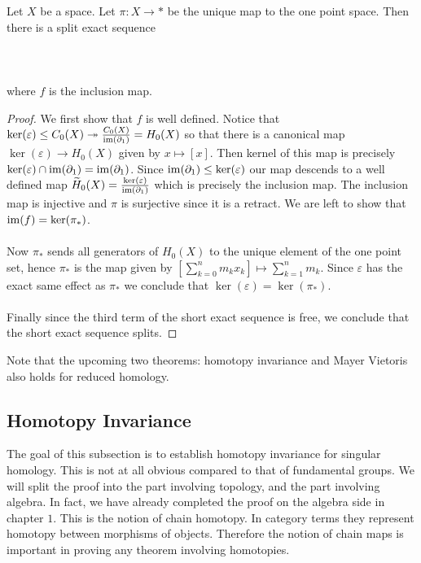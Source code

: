 \documentclass[a4paper]{article}
\begin{document}
\begin{prp}{}{} Let $X$ be a space. Let $\pi:X\to\ast$ be the unique map to the one point space. Then there is a split exact sequence \\~\\
\\~\\
where $f$ is the inclusion map. \tcbline
\begin{proof}
We first show that $f$ is well defined. Notice that $\ker(\varepsilon)\leq C_0(X)\twoheadrightarrow\frac{C_0(X)}{\operatorname{im}(\partial_1)}=H_0(X)$ so that there is a canonical map $\ker(\varepsilon)\to H_0(X)$ given by $x\mapsto[x]$. Then kernel of this map is precisely $\ker(\varepsilon)\cap\operatorname{im}(\partial_1)=\operatorname{im}(\partial_1)$. Since $\operatorname{im}(\partial_1)\leq\ker(\varepsilon)$ our map descends to a well defined map $\widetilde{H}_0(X)=\frac{\ker(\varepsilon)}{\operatorname{im}(\partial_1)}$ which is precisely the inclusion map. The inclusion map is injective and $\pi$ is surjective since it is a retract. We are left to show that $\operatorname{im}(f)=\ker(\pi_\ast)$. \\~\\

Now $\pi_\ast$ sends all generators of $H_0(X)$ to the unique element of the one point set, hence $\pi_\ast$ is the map given by $\left[\sum_{k=0}^nm_k x_k\right]\mapsto\sum_{k=1}^nm_k$. Since $\varepsilon$ has the exact same effect as $\pi_\ast$ we conclude that $\ker(\varepsilon)=\ker(\pi_\ast)$. \\~\\

Finally since the third term of the short exact sequence is free, we conclude that the short exact sequence splits. 
\end{proof}
\end{prp}

Note that the upcoming two theorems: homotopy invariance and Mayer Vietoris also holds for reduced homology. 

\subsection{Homotopy Invariance}
The goal of this subsection is to establish homotopy invariance for singular homology. This is not at all obvious compared to that of fundamental groups. We will split the proof into the part involving topology, and the part involving algebra. In fact, we have already completed the proof on the algebra side in chapter $1$. This is the notion of chain homotopy. In category terms they represent homotopy between morphisms of objects. Therefore the notion of chain maps is important in proving any theorem involving homotopies. \\~\\
\end{document}
